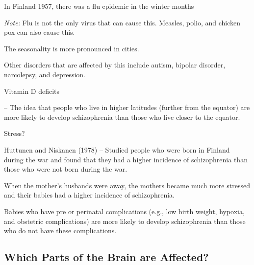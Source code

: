 \begin{coloredlist}
\begin{coloredlist}
\begin{coloredlist}
\begin{coloredlist}
\begin{coloredlist}
\begin{coloredlist}
                        \item In Finland 1957, there was a flu epidemic in the winter months
                        \item \textit{Note:} Flu is not the only virus that can cause this. Measles, polio, and chicken pox can also cause this.
                    \end{coloredlist}
                    \item The seasonality is more pronounced in cities.
                    \item Other disorders that are affected by this include autism, bipolar disorder, narcolepsy, and depression.
                \end{coloredlist}
            \end{coloredlist}
            \item Vitamin D deficits
            \begin{coloredlist}
                \item {} -- The idea that people who live in higher latitudes (further from the equator) are more likely to develop schizophrenia than those who live closer to the equator.
            \end{coloredlist}
            \item Stress?
            \begin{coloredlist}
                \item Huttunen and Niskanen (1978) -- Studied people who were born in Finland during the war and found that they had a higher incidence of schizophrenia than those who were not born during the war.
                \begin{coloredlist}
                    \item When the mother's husbands were away, the mothers became much more stressed and their babies had a higher incidence of schizophrenia.
                \end{coloredlist}
            \end{coloredlist}
            \item Babies who have pre or perinatal complications (e.g., low birth weight, hypoxia, and obstetric complications) are more likely to develop schizophrenia than those who do not have these complications.
        \end{coloredlist}
    \end{coloredlist}
\end{coloredlist}

\subsection{Which Parts of the Brain are Affected?}

